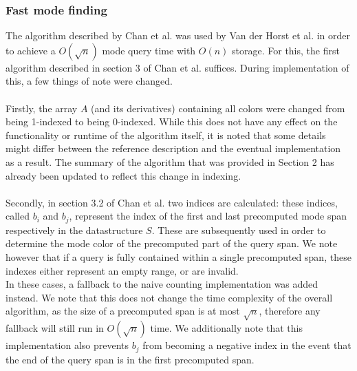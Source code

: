 \documentclass{article}
\newcommand{\fbrm}[1]{{}}
\begin{document}
\subsubsection{Fast mode finding}
The algorithm described by Chan et al. \cite{Chan2014} was used by Van der
Horst et al. in order to achieve a $O(\sqrt{n})$ mode query time with $O(n)$
storage. For this, the first algorithm described in section 3 of Chan et al.
\fbrm{their publication} suffices. During implementation of this, a few things of note
were changed.\\\\ Firstly, the array $A$ (and its derivatives) containing all
colors were changed from being 1-indexed to being 0-indexed. While this does
not have any effect on the functionality or runtime of the algorithm itself, it
is noted that some details might differ between the reference description and
the eventual implementation as a result. The summary of the algorithm that was
provided in Section 2 has already been updated to reflect this change in
indexing.\\\\ Secondly, in section 3.2 of Chan et al.\fbrm{'s publication,} two
indices are calculated: these indices, called $b_i$ and $b_j$, represent the
index of the first and last precomputed mode span respectively in the
datastructure $S$. These are subsequently used in order to determine the mode
color of the precomputed part of the query span. We note however that if a
query is fully contained within a single precomputed span, these indexes either
represent an empty range, or are invalid. \\ In these cases, a fallback to the
naive counting implementation was added instead. We note that this does not
change the time complexity of the overall algorithm, as the size of a
precomputed span is at most $\sqrt{n}$, therefore any fallback will still run
in $O(\sqrt{n})$ time. We additionally note that this implementation also
prevents $b_j$ from becoming a negative index in the event that the end of the
query span is in the first precomputed span.
\end{document}
